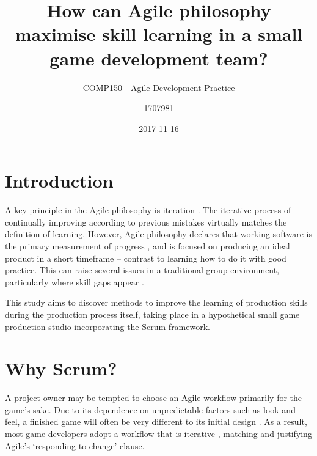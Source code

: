 \documentclass{scrartcl}
\title{How can Agile philosophy maximise skill learning in a small game development team?}
\subtitle{COMP150 - Agile Development Practice}
\date{2017-11-16}
\author{1707981}
\begin{document}
\maketitle
{}



\section{Introduction}
A key principle in the Agile philosophy is iteration \cite{agile}. The iterative process of continually improving according to previous mistakes virtually matches the definition of learning. However, Agile philosophy declares that working software is the primary measurement of progress \cite{manifesto}, and is focused on producing an ideal product in a short timeframe -- contrast to learning how to do it with good practice. This can raise several issues in a traditional group environment, particularly where skill gaps appear \cite{group2003}.

This study aims to discover methods to improve the learning of production skills during the production process itself, taking place in a hypothetical small game production studio incorporating the Scrum framework.


\section{Why Scrum?}
A project owner may be tempted to choose an Agile workflow primarily for the game's sake. Due to its dependence on unpredictable factors such as look and feel, a finished game will often be very different to its initial design \cite{collaboration}. As a result, most game developers adopt a workflow that is iterative \cite{iteration, olddays, devstudy}, matching and justifying Agile's `responding to change' \cite{manifesto} clause.
\end{document}

